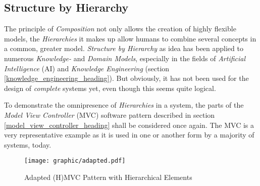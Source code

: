 %
%
%
%
%
%
%

\subsection{Structure by Hierarchy}
\label{structure_by_hierarchy_heading}

The principle of \emph{Composition} not only allows the creation of highly
flexible models, the \emph{Hierarchies} it makes up allow humans to combine
several concepts in a common, greater model. \emph{Structure by Hierarchy} as
idea has been applied to numerous \emph{Knowledge-} and \emph{Domain Models},
especially in the fields of \emph{Artificial Intelligence} (AI) and
\emph{Knowledge Engineering} (section \ref{knowledge_engineering_heading}). But
obviously, it has not been used for the design of \emph{complete} systems yet,
even though this seems quite logical.

To demonstrate the omnipresence of \emph{Hierarchies} in a system, the parts of
the \emph{Model View Controller} (MVC) software pattern described in section
\ref{model_view_controller_heading} shall be considered once again. The MVC is
a very representative example as it is used in one or another form by a
majority of systems, today.

\begin{figure}[ht]
    \begin{center}
        \texttt{[image: graphic/adapted.pdf]}
        \caption{Adapted (H)MVC Pattern with Hierarchical Elements}
        \label{adapted_figure}
    \end{center}
\end{figure}

